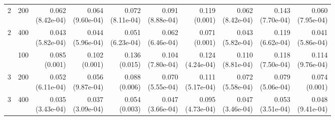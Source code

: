 \begin{table}[p]
{\begin{tabular}{llrrrrrrrr}
2 & 200 & \shortstack{0.062\\(8.42e-04)} & \shortstack{0.064\\(9.60e-04)} & \shortstack{0.072\\(8.11e-04)} & \shortstack{0.091\\(8.88e-04)} & \shortstack{0.119\\(0.001)} & \shortstack{0.062\\(8.42e-04)} & \shortstack{0.143\\(7.70e-04)} & \shortstack{0.060\\(7.95e-04)} \\
2 & 400 & \shortstack{0.043\\(5.82e-04)} & \shortstack{0.044\\(5.96e-04)} & \shortstack{0.051\\(6.23e-04)} & \shortstack{0.062\\(6.46e-04)} & \shortstack{0.071\\(0.001)} & \shortstack{0.043\\(5.82e-04)} & \shortstack{0.119\\(6.62e-04)} & \shortstack{0.041\\(5.86e-04)} \\
\addlinespace
3 & 100 & \shortstack{0.085\\(0.001)} & \shortstack{0.102\\(0.001)} & \shortstack{0.136\\(0.015)} & \shortstack{0.104\\(7.80e-04)} & \shortstack{0.124\\(4.24e-04)} & \shortstack{0.110\\(8.81e-04)} & \shortstack{0.118\\(7.50e-04)} & \shortstack{0.114\\(9.76e-04)} \\
3 & 200 & \shortstack{0.052\\(6.11e-04)} & \shortstack{0.056\\(9.87e-04)} & \shortstack{0.088\\(0.006)} & \shortstack{0.070\\(5.55e-04)} & \shortstack{0.111\\(5.17e-04)} & \shortstack{0.072\\(5.58e-04)} & \shortstack{0.079\\(5.06e-04)} & \shortstack{0.074\\(0.001)} \\
3 & 400 & \shortstack{0.035\\(3.43e-04)} & \shortstack{0.037\\(3.09e-04)} & \shortstack{0.054\\(0.003)} & \shortstack{0.047\\(3.66e-04)} & \shortstack{0.095\\(4.73e-04)} & \shortstack{0.047\\(3.46e-04)} & \shortstack{0.053\\(3.51e-04)} & \shortstack{0.048\\(9.41e-04)} \\

\end{tabular}}
\end{table}
